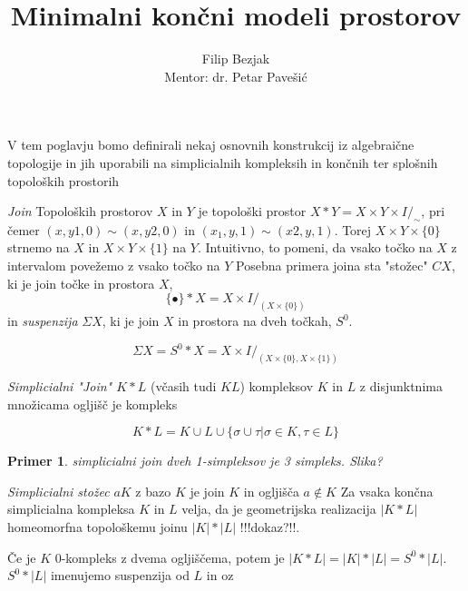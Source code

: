 \documentclass[a4paper,12pt]{article}
\title{Minimalni končni modeli prostorov}
\author{Filip Bezjak \\ Mentor: dr. Petar Pavešić}
\theoremstyle{definition}
\theoremstyle{plain}
\theoremstyle{plain}
\newtheorem{primer}{Primer}
\theoremstyle{plain}
\theoremstyle{plain}
\theoremstyle{plain}
\begin{document}
V tem poglavju bomo definirali nekaj osnovnih konstrukcij iz algebraične topologije in jih uporabili na simplicialnih kompleksih in končnih ter splošnih topoloških prostorih

\textit{Join} Topoloških prostorov $X$ in $Y$ je topološki prostor $X\ast Y = X\times Y 
\times I /_{\sim}$, pri čemer $(x, y1, 0) \sim (x, y2, 0)$ in  $(x_1, y, 1) \sim (x2, y, 1)$. 
Torej $X\times Y\times \{0\}$ strnemo na $X$ in $X\times Y\times \{1\}$ na $Y$. Intuitivno, 
to pomeni, da vsako točko na $X$ z intervalom povežemo z vsako točko na $Y$
Posebna primera joina sta "stožec" $CX$, ki je join točke in prostora $X$, 
$$\{\bullet\}\ast X=X\times I /_{(X\times \{0\})}$$
in \textit{suspenzija} $\Sigma X$, ki je join $X$ in prostora na dveh točkah, $S^0$.

$$
\Sigma X=S^0\ast X = X\times I /_{(X\times \{0\},X\times \{1\})}
$$






\textit{Simplicialni "Join" $K\ast L$} (včasih tudi $KL$) kompleksov $K$ in $L$ z disjunktnima množicama ogljišč je kompleks

$$
K\ast L=K\cup L \cup \{\sigma \cup \tau| \sigma \in K, \tau \in L \}
$$

\begin{primer}
    simplicialni join dveh 1-simpleksov je 3 simpleks. Slika?
\end{primer}

\textit{Simplicialni stožec} $aK$ z bazo $K$ je join $K$ in ogljišča $a\notin K$
Za vsaka končna simplicialna kompleksa $K$ in $L$ velja, da je geometrijska realizacija $|K\ast L|$ homeomorfna topološkemu joinu $|K|\ast |L|$ !!!dokaz?!!.

Če je $K$ 0-kompleks z dvema ogljiščema, potem je $|K\ast L|=|K|\ast |L|=S^0\ast |L|$. $S^0\ast |L|$
imenujemo suspenzija od $L$ in oz
\end{document}
